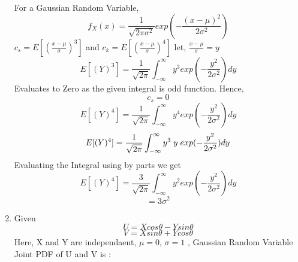 \documentclass{article}
\begin{document}
\begin{enumerate}
  For a Gaussian Random Variable,
  $$f_{X}(x) = \frac{1}{\sqrt{2\pi\sigma^2}}exp(-\frac{(x-\mu)^2}{2\sigma^2})$$
  \newline
  $c_s = E[(\frac{x - \mu}{\sigma})^3]$ and $c_k = E[(\frac{x - \mu}{\sigma})^4]$
  \newline
  \newline
  let, $\frac{x - \mu}{\sigma} = y$
  $$E[(Y)^3] = \frac{1}{\sqrt{2\pi}}\int_{-\infty}^{\infty} y^{3} exp(-\frac{y^2}{2\sigma^2})dy$$
  \newline
  Evaluates to Zero as the given integral is odd function. Hence,
  $$c_s = 0$$
  $$E[(Y)^4] = \frac{1}{\sqrt{2\pi}}\int_{-\infty}^{\infty} y^{4} exp(-\frac{y^2}{2\sigma^2})dy$$
  $$E[(Y)^4] = \frac{1}{\sqrt{2\pi}}\int_{-\infty}^{\infty} y^{3}\hspace{1mm}y\hspace{1mm} exp(-\frac{y^2}{2\sigma^2})dy$$
  Evaluating the Integral using by parts we get
  $$E[(Y)^4] = \frac{3}{\sqrt{2\pi}}\int_{-\infty}^{\infty} y^{2} exp(-\frac{y^2}{2\sigma^2})dy$$
  $$= 3\sigma^2$$

  \newpage
\item Given \\
  $$U = Xcos\theta - Ysin\theta $$
  $$V = Xsin\theta +Ycos\theta$$
  Here, X and Y are independaent, $\mu =0 $, $\sigma=1$ , Gaussian Random Variable
  Joint PDF of U and V is :


\end{enumerate}
\end{document}
